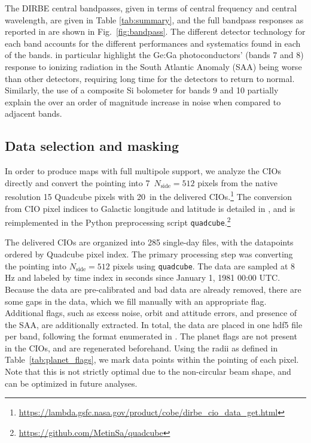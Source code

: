 \documentclass{aa}
\begin{document}
The DIRBE central bandpasses, given in terms of central frequency and central wavelength, are given in Table \ref{tab:summary}, and the full bandpass responses as reported in \citet{cobe_exsupp} are shown in Fig.~\ref{fig:bandpass}.
The different detector technology for each band accounts for the different performances and systematics found in each of the bands. \citet{silverberg93} in particular highlight the Ge:Ga photoconductors' (bands 7 and 8) response to ionizing radiation in the South Atlantic Anomaly (SAA) being worse than other detectors, requiring long time for the detectors to return to normal. Similarly, the use of a composite Si bolometer for bands 9 and 10 partially explain the over an order of magnitude increase in noise when compared to adjacent bands.

\subsection{Data selection and masking}
\label{sec:data_selection}

In order to produce maps with full multipole support, we analyze the CIOs directly and convert the pointing into 7\arcm\  $N_\mathrm{side}=512$ pixels from the native resolution 15 Quadcube pixels with 20\arcs\ in the delivered CIOs.\footnote{\url{https://lambda.gsfc.nasa.gov/product/cobe/dirbe\_cio\_data\_get.html}} The conversion from CIO pixel indices to Galactic longitude and latitude is detailed in \citet{cobe_exsupp}, and is reimplemented in the Python preprocessing script \texttt{quadcube}.\footnote{\url{https://github.com/MetinSa/quadcube}}

The delivered CIOs are organized into 285 single-day files, with the datapoints ordered by Quadcube pixel index. The primary processing step was converting the pointing into $N_\mathrm{side}=512$ pixels using \texttt{quadcube}. The data are sampled at 8\,Hz and labeled by time index in seconds since January 1, 1981 00:00 UTC. Because the data are pre-calibrated and bad data are already removed, there are some gaps in the data, which we fill manually with an appropriate flag. Additional flags, such as excess noise, orbit and attitude errors, and presence of the SAA, are additionally extracted. In total, the data are placed in one hdf5 file per band, following the format enumerated in \citet{bp03}.
The planet flags are not present in the CIOs, and are regenerated beforehand. Using the radii as defined in Table~\ref{tab:planet_flags}, we mark data points within the pointing of each pixel. Note that this is not strictly optimal due to the non-circular beam shape, and can be optimized in future analyses.
\end{document}
